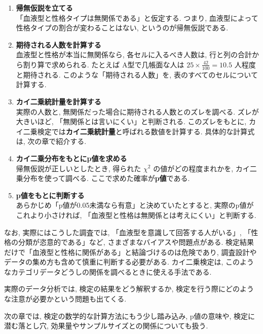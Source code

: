     \begin{enumerate}
      \item \textbf{帰無仮説を立てる} \\
        「血液型と性格タイプは無関係である」と仮定する.
        つまり, 血液型によって性格タイプの割合が変わることはない, というのが帰無仮説である.

      \item \textbf{期待される人数を計算する} \\
        血液型と性格が本当に無関係なら,
        各セルに入るべき人数は, 行と列の合計から割り算で求められる.
        たとえば A型で几帳面な人は $25 \times \frac{42}{100} = 10.5$ 人程度と期待される.
        このような「期待される人数」を, 表のすべてのセルについて計算する.

      \item \textbf{カイ二乗統計量を計算する} \\
        実際の人数と, 無関係だった場合に期待される人数とのズレを調べる.
        ズレが大きいほど, 「無関係とは言いにくい」と判断される.
        このズレをもとに, カイ二乗検定では\textbf{カイ二乗統計量}と呼ばれる数値を計算する.
        具体的な計算式は, 次の章で紹介する.

      \item \textbf{カイ二乗分布をもとにp値を求める} \\
        帰無仮説が正しいとしたとき, 得られた $\chi^2$ の値がどの程度まれかを,
        カイ二乗分布を使って調べる.
        ここで求めた確率が\textbf{p値}である.

      \item \textbf{p値をもとに判断する} \\
        あらかじめ「p値が0.05未満なら有意」と決めていたとすると,
        実際のp値がこれより小さければ,
        「血液型と性格は無関係とは考えにくい」と判断する.
    \end{enumerate}

    なお, 実際にはこうした調査では,
    「血液型を意識して回答する人がいる」,
    「性格の分類が恣意的である」など,
    さまざまなバイアスや問題点がある.
    検定結果だけで「血液型と性格に関係がある」と結論づけるのは危険であり,
    調査設計やデータの集め方も含めて慎重に判断する必要がある.
    カイ二乗検定は, このようなカテゴリデータどうしの関係を調べるときに使える手法である.


  実際のデータ分析では, 検定の結果をどう解釈するか,
  検定を行う際にどのような注意が必要かという問題も出てくる.

  次の章では,
  検定の数学的な計算方法にもう少し踏み込み,
  p値の意味や, 検定に潜む落とし穴, 効果量やサンプルサイズとの関係についても扱う.
